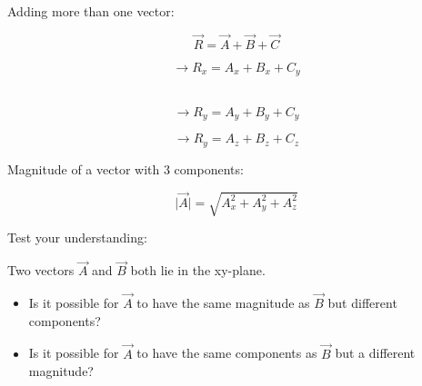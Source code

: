 \documentclass[]{beamer}
\begin{document}

\begin{frame}


Adding more than one vector:

\vspace{5mm}

\begin{equation*}
\vec{R}=\vec{A}+\vec{B}+\vec{C}
\end{equation*}

\begin{equation*}
\rightarrow R_x=A_x+B_x+C_y
\end{equation*}\

\begin{equation*}
\rightarrow R_y=A_y+B_y+C_y
\end{equation*}

\begin{equation*}
\rightarrow R_y=A_z+B_z+C_z
\end{equation*}

 \end{frame}

 

\begin{frame}


Magnitude of a vector with 3 components:
\vspace{5mm}

\begin{equation*}
\lvert \vec{A} \rvert=\sqrt{A^2_x+A^2_y+A^2_z}
\end{equation*}



 \end{frame}



\begin{frame}


Test your understanding:
\vspace{3 mm}

Two vectors $\vec{A}$ and  $\vec{B}$ both lie in the xy-plane.
\vspace{3 mm}

\begin{itemize}
\item Is it possible for $\vec{A}$ to have the same magnitude as $\vec{B}$ but different
components?
\item Is it possible for $\vec{A}$  to have the same components as $\vec{B}$  but a different
magnitude?
\end{itemize}

 \end{frame}
\end{document}
